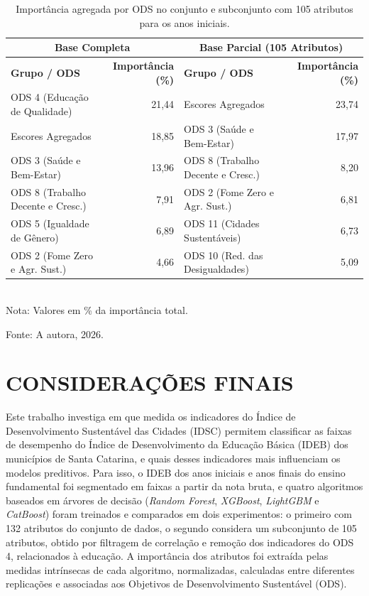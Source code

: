 \begin{table}[htbp]
	\centering
	\caption{Importância agregada por ODS no conjunto e subconjunto com 105 atributos para os anos iniciais.}
	\label{tab:ods-importance-ai}
	\small
	\renewcommand{\arraystretch}{1.3}
	\setlength{\belowcaptionskip}{6pt}
	\begin{tabularx}{\textwidth}{|X|r|X|r|}
		\hline
		\multicolumn{2}{|c|}{\textbf{Base Completa}} & \multicolumn{2}{c|}{\textbf{Base Parcial (105 Atributos)}} \\
		\hline
		\textbf{Grupo / ODS} & \textbf{Importância (\%)} & \textbf{Grupo / ODS} & \textbf{Importância (\%)} \\
		\hline
		ODS 4 (Educação de Qualidade) & 21,44 & Escores Agregados & 23,74 \\
		Escores Agregados & 18,85 & ODS 3 (Saúde e Bem-Estar) & 17,97 \\
		ODS 3 (Saúde e Bem-Estar) & 13,96 & ODS 8 (Trabalho Decente e Cresc.) & 8,20 \\
		ODS 8 (Trabalho Decente e Cresc.) & 7,91 & ODS 2 (Fome Zero e Agr. Sust.) & 6,81 \\
		ODS 5 (Igualdade de Gênero) & 6,89 & ODS 11 (Cidades Sustentáveis) & 6,73 \\
		ODS 2 (Fome Zero e Agr. Sust.) & 4,66 & ODS 10 (Red. das Desigualdades) & 5,09 \\
		\hline
	\end{tabularx}
	\\[4pt]
	\footnotesize{Nota: Valores em \% da importância total.}
	
	\vspace{2pt}
	\footnotesize{Fonte: A autora, 2026.}
\end{table}

\chapter{CONSIDERAÇÕES FINAIS}

Este trabalho investiga em que medida os indicadores do Índice de Desenvolvimento Sustentável das Cidades (IDSC) permitem classificar as faixas de desempenho do Índice de Desenvolvimento da Educação Básica (IDEB) dos municípios de Santa Catarina, e quais desses indicadores mais influenciam os modelos preditivos. Para isso, o IDEB dos anos iniciais e anos finais do ensino fundamental foi segmentado em faixas a partir da nota bruta, e quatro algoritmos baseados em árvores de decisão (\textit{Random Forest}, \textit{XGBoost}, \textit{LightGBM} e \textit{CatBoost}) foram treinados e comparados em dois experimentos: o primeiro com 132 atributos do conjunto de dados, o segundo considera um subconjunto de 105 atributos, obtido por filtragem de correlação e remoção dos indicadores do ODS 4, relacionados à educação. A importância dos atributos foi extraída pelas medidas intrínsecas de cada algoritmo, normalizadas, calculadas entre diferentes replicações e associadas aos Objetivos de Desenvolvimento Sustentável (ODS).

